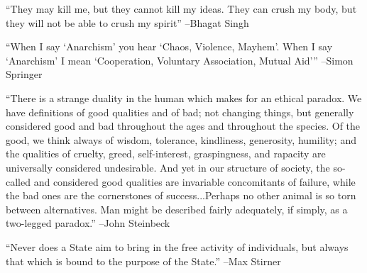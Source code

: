 \documentclass{article}%
\begin{document}
\begin{minipage}{\textwidth}%
\flushleft%
“They may kill me, but they cannot kill my ideas. They can crush my body, but they will not be able to crush my spirit”%
\linebreak%
\vspace{1mm}%
–Bhagat Singh%
\linebreak%
\vspace{1mm}%
\end{minipage}%
\linebreak%
\vspace{1mm}%
\begin{minipage}{\textwidth}%
\flushleft%
“When I say ‘Anarchism’ you hear ‘Chaos, Violence, Mayhem’. When I say ‘Anarchism’ I mean ‘Cooperation, Voluntary Association, Mutual Aid’”%
\linebreak%
\vspace{1mm}%
–Simon Springer%
\linebreak%
\vspace{1mm}%
\end{minipage}%
\linebreak%
\vspace{1mm}%
\begin{minipage}{\textwidth}%
\flushleft%
“There is a strange duality in the human which makes for an ethical paradox. We have definitions of good qualities and of bad; not changing things, but generally considered good and bad throughout the ages and throughout the species. Of the good, we think always of wisdom, tolerance, kindliness, generosity, humility; and the qualities of cruelty, greed, self{-}interest, graspingness, and rapacity are universally considered undesirable. And yet in our structure of society, the so{-}called and considered good qualities are invariable concomitants of failure, while the bad ones are the cornerstones of success...Perhaps no other animal is so torn between alternatives. Man might be described fairly adequately, if simply, as a two{-}legged paradox.”%
\linebreak%
\vspace{1mm}%
–John Steinbeck%
\linebreak%
\vspace{1mm}%
\end{minipage}%
\linebreak%
\vspace{1mm}%
\begin{minipage}{\textwidth}%
\flushleft%
“Never does a State aim to bring in the free activity of individuals, but always that which is bound to the purpose of the State.”%
\linebreak%
\vspace{1mm}%
–Max Stirner%
\linebreak%
\vspace{1mm}%
\end{minipage}%
\end{document}
